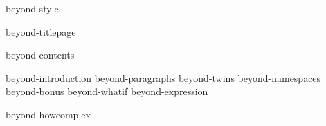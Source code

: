 
\environment beyond-style

\dontcomplain

\startdocument

    \component beyond-titlepage

    \startfrontmatter
        \component beyond-contents
    \stopfrontmatter

    \startbodymatter
        \component beyond-introduction
        \component beyond-paragraphs
        \component beyond-twins
        \component beyond-namespaces
        \component beyond-bonus
        \component beyond-whatif
        \component beyond-expression

         \stopchapter
         \stopchapter
         \stopchapter
         \stopchapter


        \component beyond-howcomplex
    \stopbodymatter

\stopdocument


